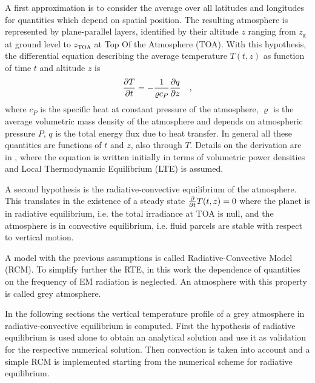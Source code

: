 \documentclass[a4paper,10pt,twocolumn,\classoptions]{article}
\newcommand{\zTOA}{z_\text{TOA}}
\begin{document}
A first approximation is to consider the average over all latitudes and longitudes for quantities which depend on spatial position. The resulting atmosphere is represented by plane-parallel layers, identified by their altitude $z$ ranging from $z_\text{g}$ at ground level to $\zTOA$ at Top Of the Atmosphere (TOA). With this hypothesis, the differential equation describing the average temperature $T(t,z)$ as function of time $t$ and altitude $z$ is
\begin{equation}
  \label{eq:temperature_derivation}
  \pdv{T}{t} = -\frac{1}{\varrho c_P} \pdv{q}{z}
  \quad ,
\end{equation}
where $c_P$ is the specific heat at constant pressure of the atmosphere, $\varrho$ is the average volumetric mass density of the atmosphere and depends on atmospheric pressure $P$, $q$ is the total energy flux due to heat transfer. In general all these quantities are functions of $t$ and $z$, also through $T$. Details on the derivation are in \cite[466]{Ramanathan}, where the equation is written initially in terms of volumetric power densities and Local Thermodynamic Equilibrium (LTE) is assumed.

A second hypothesis is the radiative-convective equilibrium of the atmosphere. This translates in the existence of a steady state $\pdv*{T(t,z)}{t} = 0$ where the planet is in radiative equilibrium, i.e. the total irradiance at TOA is null, and the atmosphere is in convective equilibrium, i.e. fluid parcels are stable with respect to vertical motion.

A model with the previous assumptions is called Radiative-Convective Model (RCM).
To simplify further the RTE, in this work the dependence of quantities on the frequency of EM radiation is neglected. An atmosphere with this property is called grey atmosphere.

In the following sections the vertical temperature profile of a grey atmosphere in radiative-convective equilibrium is computed. First the hypothesis of radiative equilibrium is used alone to obtain an analytical solution and use it as validation for the respective numerical solution. Then convection is taken into account and a simple RCM is implemented starting from the numerical scheme for radiative equilibrium.
\end{document}
